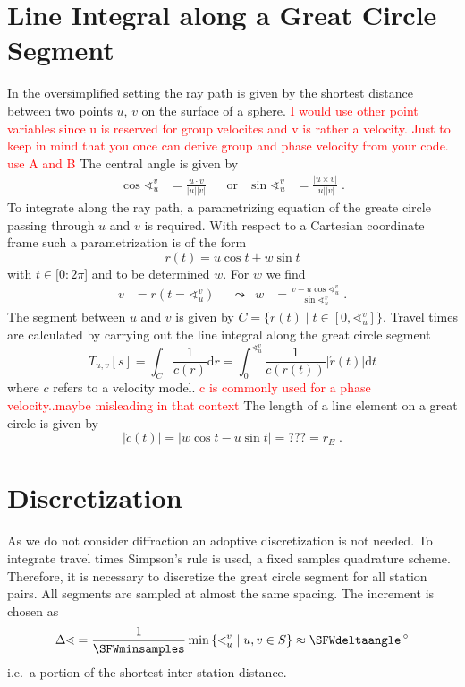 \documentclass[11pt]{article}
\newcommand\worries[1]{\textcolor{red}{#1}}
\begin{document}
\section{Line Integral along a Great Circle Segment}
In the oversimplified setting the ray path is given by the shortest distance between two points $u$, $v$ on the surface of a sphere.
\worries{I would use other point variables since u is reserved for group velocites and v is rather a velocity. Just to keep in mind that you once can derive group and phase velocity from your code. use A and B}
The central angle is given by
\begin{align}
    \cos \sphericalangle_u^v &= \frac{u \cdot v}{|u||v|} &
    &\text{or}&
    \sin \sphericalangle_u^v &= \frac{|u \times v|}{|u||v|}
    \; .
\end{align}
To integrate along the ray path, a parametrizing equation of the greate circle passing through $u$ and $v$ is required.
With respect to a Cartesian coordinate frame such a parametrization is of the form
\begin{equation}
    r(t) = u \cos t + w \sin t
\end{equation}
with $t \in [0:2\pi$] and to be determined $w$.
For $w$ we find
\begin{align}
    v &= r(t = \sphericalangle_u^v) &
    &\leadsto &
    w &= \frac{v - u \cos \sphericalangle_u^v}{\sin \sphericalangle_u^v}
    \; .
\end{align}
The segment between $u$ and $v$ is given by $C= \{r(t) \mid t \in [0, \sphericalangle_u^v]\}$.
Travel times are calculated by carrying out the line integral along the great circle segment
\begin{equation}
    T_{u,v}[s]
    = \int_C \frac1{c(r)} \mathrm d r
    = \int_0^{\sphericalangle_u^v} \frac 1{c(r(t))} |\acute r(t)| \mathrm d t
\end{equation}
where $c$ refers to a velocity model.
\worries{c is commonly used for a phase velocity..maybe misleading in that context}
The length of a line element on a great circle is given by
\begin{equation}
    |\acute c(t)| = |w \cos t - u \sin t| = ??? = r_E
    \; .
\end{equation}


\section{Discretization}

As we do not consider diffraction an adoptive discretization is not needed.
To integrate travel times Simpson's rule is used, a fixed samples quadrature scheme.
Therefore, it is necessary to discretize the great circle segment for all station pairs.
All segments are sampled at almost the same spacing.
The increment is chosen as
\begin{equation}
    \Delta\sphericalangle = \frac 1 \SFWminsamples \min\left\{ \sphericalangle_u^v \mid u,v \in S \right\}
    \approx \SFWdeltaangle \,{}^\circ
\end{equation}
i.e.~a portion of the shortest inter-station distance.
\end{document}
